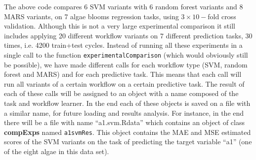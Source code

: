 \documentclass[10pt,a4paper]{article}
\begin{document}
\begin{Schunk}
\end{Schunk}

The above code compares 6 SVM variants with 6 random forest variants
and 8 MARS variants, on 7 algae blooms regression tasks, using
$3-$fold cross validation. Although this is not a very large
experimental comparison it still includes applying 20 different
workflow variants on 7 different prediction tasks, 30 times, i.e. 4200
train+test cycles. Instead of running all these experiments in a
single call to the function \texttt{experimentalComparison} (which
would obviously still be possible), we have made different calls for
each workflow type (SVM, random forest and MARS) and for each
predictive task. This means that each call will run all variants of a
certain workflow on a certain predictive task. The result of each of
these calls will be assigned to an object with a name composed of the
task and workflow learner. In the end each of these objects is saved
on a file with a similar name, for future loading and results
analysis. For instance, in the end there will be a file with name
``a1.svm.Rdata'' which contains an object of class \textbf{compExps}
named \texttt{a1svmRes}. This object contains the MAE and MSE
estimated scores of the SVM variants on the task of predicting the
target variable ``a1'' (one of the eight algae in this data set).
\end{document}
